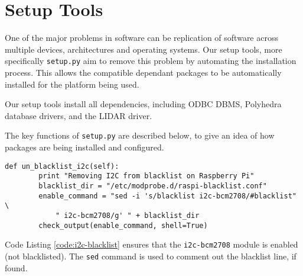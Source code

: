 \section{Setup Tools}
\pagestyle{cameron}



One of the major problems in software can be replication of software across multiple devices, architectures and operating systems. Our setup tools, more specifically \texttt{setup.py} aim to remove this problem by automating the installation process. This allows the compatible dependant packages to be automatically installed for the platform being used.

Our setup tools install all dependencies, including ODBC \gls{DBMS}, Polyhedra database drivers, and the \gls{LIDAR} driver.

The key functions of \texttt{setup.py} are described below, to give an idea of how packages are being installed and configured.

\begin{lstlisting}[style=custompython,label=code:i2c-blacklist,caption=Remove I2C from backlist function]
def un_blacklist_i2c(self):
        print "Removing I2C from blacklist on Raspberry Pi"
        blacklist_dir = "/etc/modprobe.d/raspi-blacklist.conf"
        enable_command = "sed -i 's/blacklist i2c-bcm2708/#blacklist" \
            " i2c-bcm2708/g' " + blacklist_dir
        check_output(enable_command, shell=True)
\end{lstlisting}

Code Listing \ref{code:i2c-blacklist} ensures that the \texttt{i2c-bcm2708} module is enabled (not blacklisted). The \texttt{sed} command is used to comment out the blacklist line, if found.

